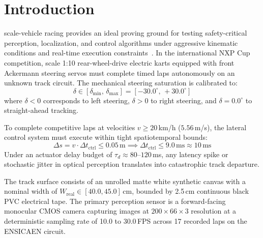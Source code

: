 \documentclass[10pt,journal,compsoc]{IEEEtran}
\begin{document}
\maketitle
\IEEEdisplaynontitleabstractindextext
\IEEEpeerreviewmaketitle

\section{Introduction}
 scale-vehicle racing provides an ideal proving ground for testing safety-critical perception, localization, and control algorithms under aggressive kinematic conditions and real-time execution constraints~\cite{bojarski2016end}. In the international NXP Cup competition, scale 1:10 rear-wheel-drive electric karts equipped with front Ackermann steering servos must complete timed laps autonomously on an unknown track circuit. The mechanical steering saturation is calibrated to:
\begin{equation}
\delta \in [\delta_{\min}, \, \delta_{\max}] = [-30.0^\circ, \, +30.0^\circ]
\end{equation}
where $\delta < 0$ corresponds to left steering, $\delta > 0$ to right steering, and $\delta = 0.0^\circ$ to straight-ahead tracking.

To complete competitive laps at velocities $v \ge 20$\,km/h ($5.56$\,m/s), the lateral control system must execute within tight spatiotemporal bounds:
\begin{equation}
\Delta s = v \cdot \Delta t_{\text{ctrl}} \le 0.05\,\text{m} \implies \Delta t_{\text{ctrl}} \le 9.0\,\text{ms} \approx 10\,\text{ms}
\end{equation}
Under an actuator delay budget of $\tau_d \approx 80\text{--}120$\,ms, any latency spike or stochastic jitter in optical perception translates into catastrophic track departure.

The track surface consists of an unrolled matte white synthetic canvas with a nominal width of $W_{\text{real}} \in [40.0, 45.0]$\,cm, bounded by 2.5\,cm continuous black PVC electrical tape. The primary perception sensor is a forward-facing monocular CMOS camera capturing images at $200 \times 66 \times 3$ resolution at a deterministic sampling rate of 10.0 to 30.0\,FPS across 17 recorded laps on the ENSICAEN circuit.
\end{document}
